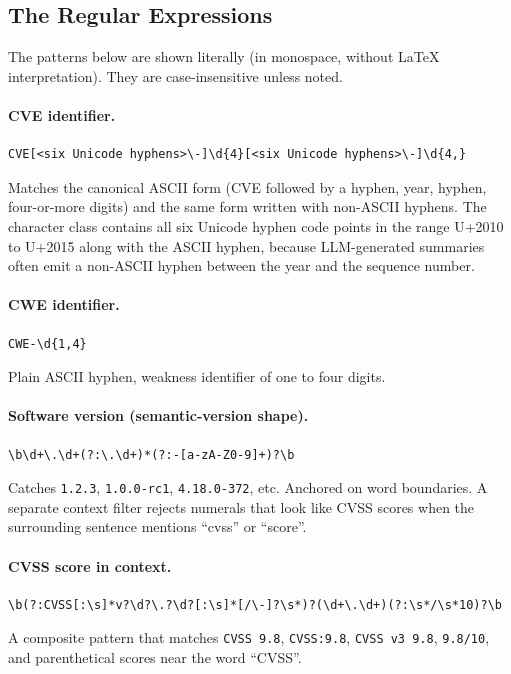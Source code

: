 \documentclass[11pt]{article}
\begin{document}
\subsection{The Regular Expressions}

The patterns below are shown literally (in monospace, without LaTeX
interpretation). They are case-insensitive unless noted.

\paragraph{CVE identifier.}
\begin{verbatim}
CVE[<six Unicode hyphens>\-]\d{4}[<six Unicode hyphens>\-]\d{4,}
\end{verbatim}
Matches the canonical ASCII form (CVE followed by a hyphen, year,
hyphen, four-or-more digits) and the same form written with non-ASCII
hyphens. The character class contains all six Unicode hyphen code
points in the range U+2010 to U+2015 along with the ASCII hyphen,
because LLM-generated summaries often emit a non-ASCII hyphen between
the year and the sequence number.

\paragraph{CWE identifier.}
\begin{verbatim}
CWE-\d{1,4}
\end{verbatim}
Plain ASCII hyphen, weakness identifier of one to four digits.

\paragraph{Software version (semantic-version shape).}
\begin{verbatim}
\b\d+\.\d+(?:\.\d+)*(?:-[a-zA-Z0-9]+)?\b
\end{verbatim}
Catches \texttt{1.2.3}, \texttt{1.0.0-rc1}, \texttt{4.18.0-372}, etc.
Anchored on word boundaries. A separate context filter rejects numerals
that look like CVSS scores when the surrounding sentence mentions
``cvss'' or ``score''.

\paragraph{CVSS score in context.}
\begin{verbatim}
\b(?:CVSS[:\s]*v?\d?\.?\d?[:\s]*[/\-]?\s*)?(\d+\.\d+)(?:\s*/\s*10)?\b
\end{verbatim}
A composite pattern that matches \texttt{CVSS 9.8}, \texttt{CVSS:9.8},
\texttt{CVSS v3 9.8}, \texttt{9.8/10}, and parenthetical scores near
the word ``CVSS''.
\end{document}
